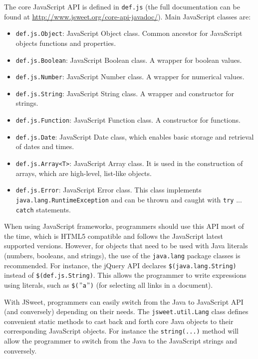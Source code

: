 \documentclass[a4paper]{report}
\begin{document}
The core JavaScript API is defined in \texttt{def.js} (the full documentation can be found at \url{http://www.jsweet.org/core-api-javadoc/}). Main JavaScript classes are:

\begin{itemize}
\item \texttt{def.js.Object}: JavaScript Object class. Common ancestor for JavaScript objects functions and properties.
\item \texttt{def.js.Boolean}: JavaScript Boolean class. A wrapper for boolean values.
\item \texttt{def.js.Number}: JavaScript Number class. A wrapper for numerical values.
\item \texttt{def.js.String}: JavaScript String class. A wrapper and constructor for strings.
\item \texttt{def.js.Function}: JavaScript Function class. A constructor for functions.
\item \texttt{def.js.Date}: JavaScript Date class, which enables basic storage and retrieval of dates and times.
\item \texttt{def.js.Array<T>}: JavaScript Array class. It is used in the construction of arrays, which are high-level, list-like objects.
\item \texttt{def.js.Error}: JavaScript Error class. This class implements \texttt{java.lang.RuntimeException} and can be thrown and caught with \texttt{try} ... \texttt{catch} statements.
\end{itemize}

When using JavaScript frameworks, programmers should use this API most of the time, which is HTML5 compatible and follows the JavaScript latest supported versions. However, for objects that need to be used with Java literals (numbers, booleans, and strings), the use of the \texttt{java.lang} package classes is recommended. For instance, the jQuery API declares \texttt{\$(java.lang.String)} instead of \texttt{\$(def.\-js.\-String)}. This allows the programmer to write expressions using literals, such as \texttt{\$($"$a$"$)} (for selecting all links in a document).

With JSweet, programmers can easily switch from the Java to JavaScript API (and conversely) depending on their needs. The \texttt{jsweet.util.Lang} class defines convenient static methods to cast back and forth core Java objects to their corresponding JavaScript objects. For instance the \texttt{string(...)} method will allow the programmer to switch from the Java to the JavaScript strings and conversely.
\end{document}
